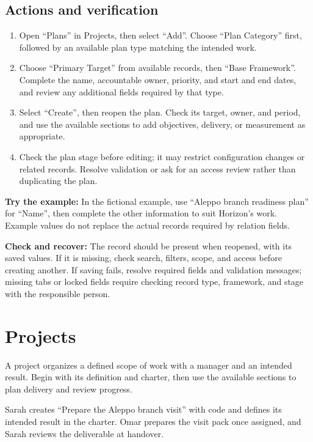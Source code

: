 \subsection{Actions and verification}
\begin{enumerate}
\item Open “Plans” in Projects, then select “Add”. Choose “Plan Category” first, followed by an available plan type matching the intended work.
\item Choose “Primary Target” from available records, then “Base Framework”. Complete the name, accountable owner, priority, and start and end dates, and review any additional fields required by that type.
\item Select “Create”, then reopen the plan. Check its target, owner, and period, and use the available sections to add objectives, delivery, or measurement as appropriate.
\item Check the plan stage before editing; it may restrict configuration changes or related records. Resolve validation or ask for an access review rather than duplicating the plan.
\end{enumerate}

\textbf{Try the example:} In the fictional example, use “Aleppo branch readiness plan” for “Name”, then complete the other information to suit Horizon's work. Example values do not replace the actual records required by relation fields.

\textbf{Check and recover:} The record should be present when reopened, with its saved values. If it is missing, check search, filters, scope, and access before creating another. If saving fails, resolve required fields and validation messages; missing tabs or locked fields require checking record type, framework, and stage with the responsible person.

\clearpage
\section{Projects}
\label{sec:projects-feature-projects}

A project organizes a defined scope of work with a manager and an intended result. Begin with its definition and charter, then use the available sections to plan delivery and review progress.

\begin{rcnote}
Sarah creates “Prepare the Aleppo branch visit” with code  and defines its intended result in the charter. Omar prepares the visit pack once assigned, and Sarah reviews the deliverable at handover.
\end{rcnote}

